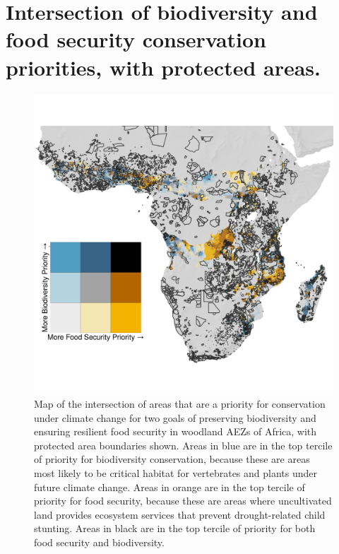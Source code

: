 \documentclass[titlepage]{article}
\begin{document}


\newpage

\section{Intersection of biodiversity and food security conservation priorities, with protected areas.}

\begin{figure}[h!]
	\begin{center}
		\includegraphics[width=\linewidth]{Bivariate_Map_WDPA.png}
		\caption{Map of the intersection of areas that are a priority for conservation under climate change for two goals of preserving biodiversity and ensuring resilient food security in woodland AEZs of Africa, with protected area boundaries shown.  Areas in blue are in the top tercile of priority for biodiversity conservation, because these are areas most likely to be critical habitat for vertebrates and plants under future climate change.  Areas in orange are in the top tercile of priority for food security, because these are areas where uncultivated land provides ecosystem services that prevent drought-related child stunting.  Areas in black are in the top tercile of priority for both food security and biodiversity.}
		\label{fig:Bivariate_Map_WDPA}
	\end{center}
\end{figure}
\end{document}
